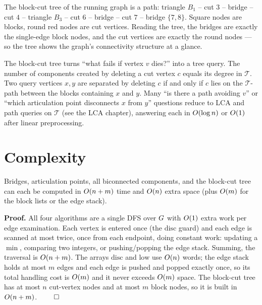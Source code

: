 The block-cut tree of the running graph is a path: triangle $B_1$ -- cut $3$ -- bridge
-- cut $4$ -- triangle $B_3$ -- cut $6$ -- bridge -- cut $7$ -- bridge $\{7,8\}$. Square
nodes are blocks, round red nodes are cut vertices. Reading the tree, the bridges are
exactly the single-edge block nodes, and the cut vertices are exactly the round nodes
--- so the tree shows the graph's connectivity structure at a glance.

\begin{applicationbox}
The block-cut tree turns ``what fails if vertex $v$ dies?'' into a tree query. The
number of components created by deleting a cut vertex $c$ equals its degree in
$\mathcal{T}$. Two query vertices $x,y$ are separated by deleting $c$ if and only if $c$ lies on
the $\mathcal{T}$-path between the blocks containing $x$ and $y$. Many ``is there a
path avoiding $v$'' or ``which articulation point disconnects $x$ from $y$'' questions
reduce to LCA and path queries on $\mathcal{T}$ (see the LCA chapter), answering each in
$O(\log n)$ or $O(1)$ after linear preprocessing.
\end{applicationbox}

\section{Complexity}
\label{ch10:complexity}

\begin{theorem}
\label{ch10:thm-time}
Bridges, articulation points, all biconnected components, and the block-cut tree can
each be computed in $O(n+m)$ time and $O(n)$ extra space (plus $O(m)$ for the
block lists or the edge stack).
\end{theorem}

\begin{formalbox}
\textbf{Proof.} All four algorithms are a single DFS over $G$ with $O(1)$ extra
work per edge examination. Each vertex is entered once (the $\mathrm{disc}$ guard) and
each edge is scanned at most twice, once from each endpoint, doing constant work:
updating a $\min$, comparing two integers, or pushing/popping the edge stack. Summing,
the traversal is $O(n+m)$. The arrays $\mathrm{disc}$ and $\mathrm{low}$ use $O(n)$
words; the edge stack holds at most $m$ edges and each edge is pushed and popped exactly
once, so its total handling cost is $O(m)$ and it never exceeds $O(m)$ space. The
block-cut tree has at most $n$ cut-vertex nodes and at most $m$ block nodes, so it is
built in $O(n+m)$. $\qed$
\end{formalbox}


